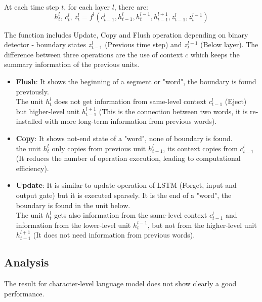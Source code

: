 \documentclass{article}
\begin{document}
At each time step $t$, for each layer $l$, there are:
\begin{equation}
h_t^l,\, c_t^l,\, z_t^l = f^l (c_{t-1}^l, h_{t-1}^l, h_t^{l-1}, h_{t-1}^{l+1}, z_{t-1}^l, z_t^{l-1})
\end{equation}

The function includes Update, Copy and Flush operation depending on binary detector - boundary states $z_{t-1}^l$ (Previous time step) and $z_t^{l-1}$ (Below layer).
The difference between three operations are the use of context $c$ which keeps the summary information of the previous units.
\begin{itemize}
\item \textbf{Flush}: It shows the beginning of a segment or "word", the boundary is found previously.
\\ The unit $h_t^l$ does not get information from same-level context $c_{t-1}^l$ (Eject) but higher-level unit $h_{t-1}^{l+1}$ (This is the connection between two words, it is re-installed with more long-term information from previous words). 

\item  \textbf{Copy}: It shows not-end state of a "word", none of boundary is found.
\\ the unit  $h_t^l$ only copies from previous unit $h_{t-1}^l$, its context copies from $c_{t-1}^l$ (It reduces the number of operation execution, leading to computational efficiency).

\item \textbf{Update}: It is similar to update operation of LSTM (Forget, input and output gate) but it is executed sparsely. It is the end of a "word", the boundary is found in the unit below.
\\ The unit $h_t^l$ gets also information from the same-level context $c_{t-1}^l$ and information from the lower-level unit $h_t^{l-1}$, but not from the higher-level unit $h_{t-1}^{l+1}$ (It does not need information from previous words).
\end{itemize}

\subsection{Analysis}
The result for character-level language model does not show clearly a good performance.

\end{document}
